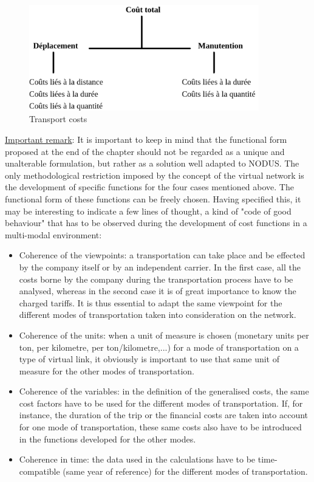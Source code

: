 \begin{figure}[htbp]
\centerline{\includegraphics[width=10cm]{f4_1.png}}
\caption{\label{f4_1} Transport costs}
\end{figure}



\underline{Important remark}: It is important to keep in mind that
the functional form proposed at the end of the chapter should not be regarded as
a unique and unalterable formulation, but rather as a solution well adapted to
NODUS.  The only methodological restriction imposed by the concept of the
virtual network is the development of specific functions for the four cases
mentioned above.  The functional form of these functions can be freely chosen. Having specified this, it may be interesting to
indicate a few lines of thought, a kind of "code of good behaviour" that has to
be observed during the development of cost functions in a multi-modal
environment:



\begin{itemize}
\item Coherence of the viewpoints: a transportation can take place and be
effected by the company itself or by an independent carrier.  In the first case,
all the costs borne by the company during the transportation process have to be
analysed, whereas in the second case it is of great importance to know the
charged tariffs.  It is thus essential to adapt the same viewpoint for the
different modes of transportation taken into consideration on the network.

\item Coherence of the units: when a unit of measure is chosen (monetary units per ton, per
kilometre, per ton/kilometre,...) for a mode of transportation on a type of
virtual link, it obviously is important to use that same unit of measure for
the other modes of transportation.

\item Coherence of the variables: in the definition of the generalised costs, the same
cost factors have to be used for the different modes of transportation. If, for
instance, the duration of the trip or the financial costs are taken into
account for one mode of transportation, these same costs also have to be
introduced in the functions developed for the other modes.

\item Coherence in time: the data used in the calculations have to be time-compatible (same year of reference) for the different modes of transportation.
\end{itemize}



